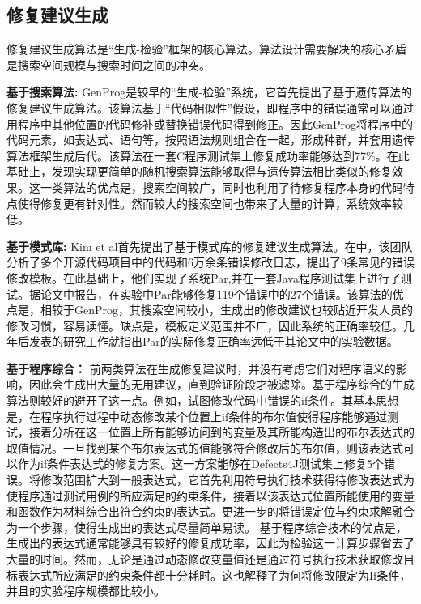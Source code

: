 \subsection{修复建议生成}
修复建议生成算法是“生成-检验”框架的核心算法。算法设计需要解决的核心矛盾是搜索空间规模与搜索时间之间的冲突。




\textbf{基于搜索算法:}
GenProg\cite{6035728}是较早的“生成-检验”系统，它首先提出了基于遗传算法的修复建议生成算法。该算法基于“代码相似性”假设，即程序中的错误通常可以通过用程序中其他位置的代码修补或替换错误代码得到修正。因此GenProg将程序中的代码元素，如表达式、语句等，按照语法规则组合在一起，形成种群，并套用遗传算法框架生成后代。该算法在一套C程序测试集上修复成功率能够达到77\%。在此基础上，\cite{Qi:2014:SRS:2568225.2568254}发现实现更简单的随机搜索算法能够取得与遗传算法相比类似的修复效果。这一类算法的优点是，搜索空间较广，同时也利用了待修复程序本身的代码特点使得修复更有针对性。然而较大的搜索空间也带来了大量的计算，系统效率较低。

\textbf{基于模式库:}
Kim et al\cite{kim2013automatic}首先提出了基于模式库的修复建议生成算法。在\cite{kim2013automatic}中，该团队分析了多个开源代码项目中的代码和6万余条错误修改日志，提出了9条常见的错误修改模板。在此基础上，他们实现了系统Par,并在一套Java程序测试集上进行了测试。据论文中报告，在实验中Par能够修复119个错误中的27个错误。该算法的优点是，相较于GenProg，其搜索空间较小，生成出的修改建议也较贴近开发人员的修改习惯，容易读懂。缺点是，模板定义范围并不广，因此系统的正确率较低。几年后发表的研究工作\cite{long2016automatic}就指出Par的实际修复正确率远低于其论文中的实验数据。

\textbf{基于程序综合：}
前两类算法在生成修复建议时，并没有考虑它们对程序语义的影响，因此会生成出大量的无用建议，直到验证阶段才被滤除。基于程序综合的生成算法则较好的避开了这一点。例如，\cite{demarco2014automatic}试图修改代码中错误的if条件。其基本思想是，在程序执行过程中动态修改某个位置上if条件的布尔值使得程序能够通过测试，接着分析在这一位置上所有能够访问到的变量及其所能构造出的布尔表达式的取值情况。一旦找到某个布尔表达式的值能够符合修改后的布尔值，则该表达式可以作为if条件表达式的修复方案。这一方案能够在Defects4J测试集上修复5个错误。\cite{nguyen2013semfix}将修改范围扩大到一般表达式，它首先利用符号执行技术获得待修改表达式为使程序通过测试用例的所应满足的约束条件，接着以该表达式位置所能使用的变量和函数作为材料综合出符合约束的表达式。\cite{mechtaev2015directfix}更进一步的将错误定位与约束求解融合为一个步骤，使得生成出的表达式尽量简单易读。%
基于程序综合技术的优点是，生成出的表达式通常能够具有较好的修复成功率，因此为检验这一计算步骤省去了大量的时间。然而，无论是通过动态修改变量值还是通过符号执行技术获取修改目标表达式所应满足的约束条件都十分耗时。这也解释了为何\cite{demarco2014automatic}将修改限定为If条件，并且\cite{nguyen2013semfix}\cite{mechtaev2015directfix}的实验程序规模都比较小。

